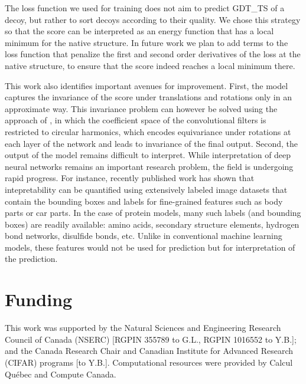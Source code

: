 \documentclass{bioinfo}
\begin{document}
The loss function we used for training does not aim to predict GDT\_TS
of a decoy, but rather to sort decoys according to their quality. We
chose this strategy so that the score can be interpreted as an energy
function that has a local minimum for the native structure. In future
work we plan to add terms to the loss function that penalize the first
and second order derivatives of the loss at the native structure, to
ensure that the score indeed reaches a local minimum there.

This work also identifies important avenues for improvement. First,
the model captures the invariance of the score under translations and
rotations only in an approximate way. This invariance problem can
however be solved using the approach of \citet{worrall2016harmonic},
in which the coefficient space of
the convolutional filters is restricted to circular harmonics, which
encodes equivariance under rotations at each layer of the network and
leads to invariance of the final output.
%
Second, the output of the model remains difficult to interpret. While
interpretation of deep neural networks remains an important research
problem, the field is undergoing rapid progress. For instance,
recently published work \citep{bau2017network} has shown that
intepretability can be quantified using extensively labeled image
datasets that contain the bounding boxes and labels for fine-grained
features such as body parts or car parts. In the case of protein
models, many such labels (and bounding boxes) are readily available:
amino acids, secondary structure elements, hydrogen bond networks,
disulfide bonds, etc. Unlike in conventional machine learning models,
these features would not be used for prediction but for interpretation
of the prediction.

\section*{Funding}
This work was supported by the Natural Sciences and Engineering
Research Council of Canada (NSERC) [RGPIN 355789 to G.L., RGPIN
1016552 to Y.B.]; and the Canada Research Chair and Canadian
Institute for Advanced Research (CIFAR) programs [to Y.B.].
Computational resources were provided by Calcul Qu{\'e}bec and Compute
Canada.




\end{document}
